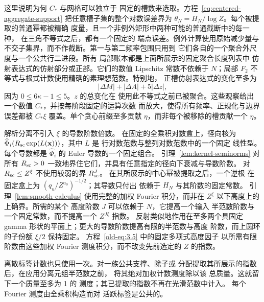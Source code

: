 这里说明为何 \(C_*\) 与网格可以独立于
固定的槽数来选取。方程~\eqref{eq:centered-aggregate-support}
把任意槽子集的整个对数误差界为
\(\theta_N=H_N/\log Z\)。每个被提取的普通幂都被精确
度量，且一个非例外矩形中两种可能的普通截断中的每一种，
在三角不等式之后，都有一个固定的
端点误差。例外计算使用原始减少量与
不交子集界，而不作截断。第一与第二频率包围只用到
它们各自的一个聚合外尺度与一个公共行二进段。所有
局部账本都是上面所展示的固定聚合长度列表中
仿射表达式的仿射部分或正部。它们的数值
Lipschitz 常数不依赖于 \(N\)；局部 \(F_2\)
不等式与根式计数使用精确的素理想范数。特别地，
正槽仿射表达式的变化至多为
\begin{equation}
 |\Delta M|+|\Delta A|+5|\Delta z|,
 \label{old-eq:2.1j}
\end{equation}
因为 \(0\le6\kappa-1\le5\)。\(z\) 的总变化在
使用此不等式之前已被聚合。这些观察给出
一个数值 \(C_*\)，并按每阶段固定的运算次数
而放大，使得所有频率、正规化与边界
误差都被 \(C_*\xi\) 覆盖。单个贪心前缀至多贡献
\(\eta\)，而非每个被移除的槽贡献一个 \(\eta\)。

解析分离不引入 \(\xi\) 的导数阶数倍数。
在固定的全乘积对数盒上，径向核为
\(\widehat\Phi_i(R_{\rm sc}\exp(L(\mathbf x)))\)，其中 \(L\) 是
行对数范数与整列对数范数中的一个固定
线性型。每个导数都是 \(\widehat\Phi_i\) 的 Euler 导数的一个固定组合。
引理~\ref{lem:kernel-seminorms} 对所有
\(R_{\rm sc}>0\) 一致地界住它们，并具有任意指定的径向下衰减与导数阶数。
对 \(R_{\rm sc}\le Z^\xi\) 不使用较弱的界 \(R_{\rm sc}^J\)。
在其所展示的中心幂被提取之后，一个逆根
在固定盒上为 \((q_u/Z^{a_0})^{-1/2}\)；其导数只付出
依赖于 \(H_N\) 与其阶数的固定常数。
引理~\ref{lem:smooth-calculus} 使用完整的加权 Fourier
积分，而非在 \(Z^\xi\) 以下高度上的上确界。所需的某个
高度阶数 \(J\) 可以依赖于 \(N\)，它提高一个输入
半范数阶数与一个固定常数，而不提高一个 \(Z^{J\xi}\) 指数。
反射类似地作用在至多两个具固定 gamma
形状的平面上；更大的导数阶数提高有限的半范数与高度
阶数，而上圆环的子份额 \(\xi/2\) 保持固定。
方程~\eqref{old-eq:3.5} 中的固定多项式高度因子
以所需有限阶数由这些加权 Fourier 测度积分，而不改变先前选定的 \(Z\) 的指数。

离散标签计数也只使用一次。对一族公共支撑、除子或
分配提取其所展示的指数后，在应用分离元组半范数之前，
将其绝对加权计数测度除以该
总质量。这就留下一个质量至多为 1 的
测度；其已提取的指数不再在光滑范数中计入。
每个 Fourier 测度由全乘积构造而对
活跃标签是公共的。

